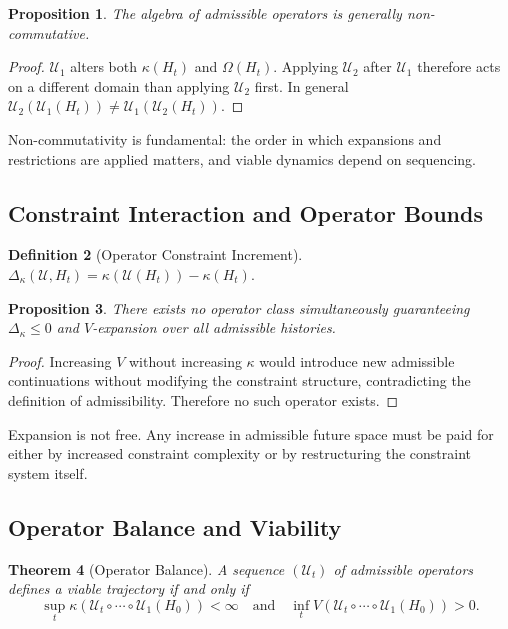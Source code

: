 \documentclass[12pt, a4paper]{article}
\theoremstyle{plain}
\newtheorem{theorem}{Theorem}[section]
\newtheorem{proposition}[theorem]{Proposition}
\theoremstyle{definition}
\newtheorem{definition}[theorem]{Definition}
\theoremstyle{remark}
\begin{document}
\begin{proposition}
The algebra of admissible operators is generally non-commutative.
\end{proposition}

\begin{proof}
$\mathcal{U}_1$ alters both $\kappa(H_t)$ and $\Omega(H_t)$. Applying $\mathcal{U}_2$ after $\mathcal{U}_1$ therefore acts on a different domain than applying $\mathcal{U}_2$ first. In general $\mathcal{U}_2(\mathcal{U}_1(H_t)) \neq \mathcal{U}_1(\mathcal{U}_2(H_t))$.
\end{proof}

Non-commutativity is fundamental: the order in which expansions and restrictions are applied matters, and viable dynamics depend on sequencing.

\subsection{Constraint Interaction and Operator Bounds}

\begin{definition}[Operator Constraint Increment]
$\Delta_\kappa(\mathcal{U}, H_t) = \kappa(\mathcal{U}(H_t)) - \kappa(H_t)$.
\end{definition}

\begin{proposition}
There exists no operator class simultaneously guaranteeing $\Delta_\kappa \leq 0$ and $V$-expansion over all admissible histories.
\end{proposition}

\begin{proof}
Increasing $V$ without increasing $\kappa$ would introduce new admissible continuations without modifying the constraint structure, contradicting the definition of admissibility. Therefore no such operator exists.
\end{proof}

Expansion is not free. Any increase in admissible future space must be paid for either by increased constraint complexity or by restructuring the constraint system itself.

\subsection{Operator Balance and Viability}

\begin{theorem}[Operator Balance]
A sequence $(\mathcal{U}_t)$ of admissible operators defines a viable trajectory if and only if
\[
\sup_t \kappa(\mathcal{U}_t \circ \cdots \circ \mathcal{U}_1(H_0)) < \infty
\quad \text{and} \quad
\inf_t V(\mathcal{U}_t \circ \cdots \circ \mathcal{U}_1(H_0)) > 0.
\]
\end{theorem}
\end{document}
